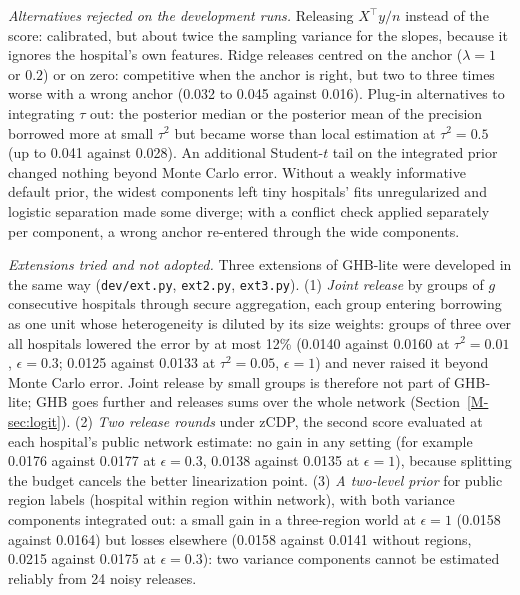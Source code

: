 \documentclass[acmsmall,screen,nonacm]{acmart}
\theoremstyle{acmdefinition}
\begin{document}
\emph{Alternatives rejected on the development runs.} Releasing $X^\top y/n$ instead of the score: calibrated, but about twice the sampling variance for the slopes, because it ignores the hospital's own features. Ridge releases centred on the anchor ($\lambda=1$ or $0.2$) or on zero: competitive when the anchor is right, but two to three times worse with a wrong anchor (0.032 to 0.045 against 0.016). Plug-in alternatives to integrating $\tau$ out: the posterior median or the posterior mean of the precision borrowed more at small $\tau^2$ but became worse than local estimation at $\tau^2=0.5$ (up to 0.041 against 0.028). An additional Student-$t$ tail on the integrated prior changed nothing beyond Monte Carlo error. Without a weakly informative default prior, the widest components left tiny hospitals' fits unregularized and logistic separation made some diverge; with a conflict check applied separately per component, a wrong anchor re-entered through the wide components.

\emph{Extensions tried and not adopted.} Three extensions of GHB-lite were developed in the same way (\texttt{dev/ext.py}, \texttt{ext2.py}, \texttt{ext3.py}). (1) \emph{Joint release} by groups of $g$ consecutive hospitals through secure aggregation, each group entering borrowing as one unit whose heterogeneity is diluted by its size weights: groups of three over all hospitals lowered the error by at most 12\% (0.0140 against 0.0160 at $\tau^2=0.01$, $\epsilon=0.3$; 0.0125 against 0.0133 at $\tau^2=0.05$, $\epsilon=1$) and never raised it beyond Monte Carlo error. Joint release by small groups is therefore not part of GHB-lite; GHB goes further and releases sums over the whole network (Section~\ref{M-sec:logit}). (2) \emph{Two release rounds} under zCDP, the second score evaluated at each hospital's public network estimate: no gain in any setting (for example 0.0176 against 0.0177 at $\epsilon=0.3$, 0.0138 against 0.0135 at $\epsilon=1$), because splitting the budget cancels the better linearization point. (3) \emph{A two-level prior} for public region labels (hospital within region within network), with both variance components integrated out: a small gain in a three-region world at $\epsilon=1$ (0.0158 against 0.0164) but losses elsewhere (0.0158 against 0.0141 without regions, 0.0215 against 0.0175 at $\epsilon=0.3$): two variance components cannot be estimated reliably from 24 noisy releases.




\end{document}
